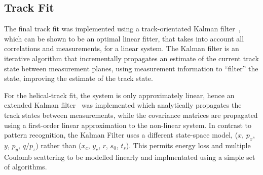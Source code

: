    \subsection{Track Fit}
   \label{subsec:FinalTrackFit}
   The final track fit was implemented using a track-orientated Kalman filter~\cite{Fruhwirth,Billoir}, which can be shown to be an optimal linear fitter, that takes into account all correlations and measurements, for a linear system. The Kalman filter is an iterative algorithm that incrementally propagates an estimate of the current track state between measurement planes, using measurement information to ``filter'' the state, improving the estimate of the track state.
   
   For the helical-track fit, the system is only approximately linear, hence an extended Kalman filter~\cite{Goodwin} was implemented which analytically propagates the track states between measurements, while the covariance matrices are propagated using a first-order linear approximation to the non-linear system.  In contrast to pattern recognition, the Kalman Filter uses a different state-space model, ($x$, $p_x$, $y$, $p_y$, $q/p_z$) rather than ($x_c$, $y_c$, $r$, $s_0$, $t_s$). This permits energy loss and multiple Coulomb scattering to be modelled linearly and implmentated using a simple set of algorithms. 

